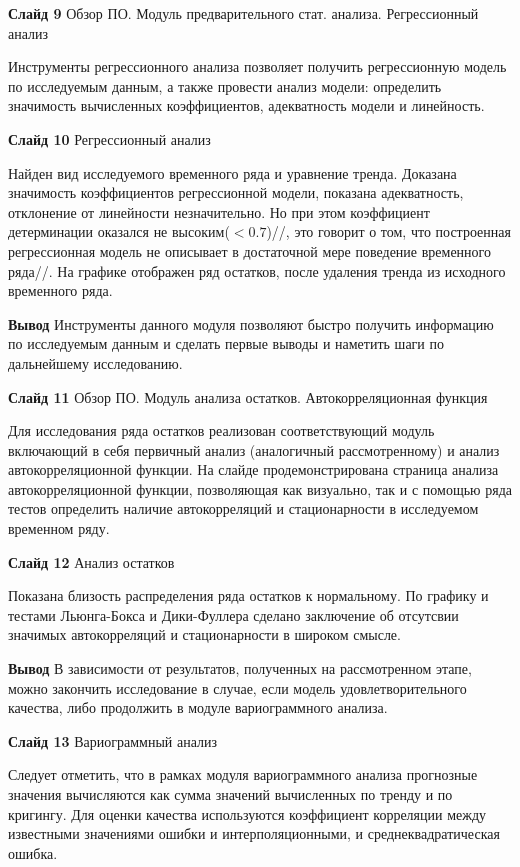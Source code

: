 \documentclass[a4paper,10pt]{report}
\begin{document}
\textbf{Слайд 9} Обзор ПО. Модуль предварительного стат. анализа. Регрессионный анализ

Инструменты регрессионного анализа позволяет получить регрессионную модель по исследуемым данным, а также провести анализ модели: определить значимость вычисленных коэффициентов, адекватность модели и линейность.

\textbf{Слайд 10} Регрессионный анализ

Найден вид исследуемого временного ряда и уравнение тренда. Доказана значимость коэффициентов регрессионной модели, показана адекватность, отклонение от линейности незначительно. Но при этом коэффициент детерминации оказался не высоким($<0.7$)//, это говорит о том, что построенная регрессионная модель не описывает в достаточной мере поведение временного ряда//. На графике отображен ряд остатков, после удаления тренда из исходного временного ряда.

\textbf{Вывод} Инструменты данного модуля позволяют быстро получить информацию по исследуемым данным и сделать первые выводы и наметить шаги по дальнейшему исследованию.

\textbf{Слайд 11} Обзор ПО. Модуль анализа остатков. Автокорреляционная функция

Для исследования ряда остатков реализован соответствующий модуль включающий в себя первичный анализ (аналогичный рассмотренному) и анализ автокорреляционной функции. На слайде продемонстрирована страница анализа автокорреляционной функции, позволяющая как визуально, так и с помощью ряда тестов определить наличие автокорреляций и стационарности в исследуемом временном ряду.

\textbf{Слайд 12} Анализ остатков

Показана близость распределения ряда остатков к нормальному. По графику и тестами Льюнга-Бокса и Дики-Фуллера сделано заключение об отсутсвии значимых автокорреляций и стационарности в широком смысле.

\textbf{Вывод} В зависимости от результатов, полученных на рассмотренном этапе, можно закончить исследование в случае, если модель удовлетворительного качества, либо продолжить в модуле вариограммного анализа.

\textbf{Слайд 13} Вариограммный анализ

Следует отметить, что в рамках модуля вариограммного анализа прогнозные значения вычисляются как сумма значений вычисленных по тренду и по кригингу. Для оценки качества используются коэффициент корреляции между известными значениями ошибки и интерполяционными, и среднеквадратическая ошибка.
\end{document}
